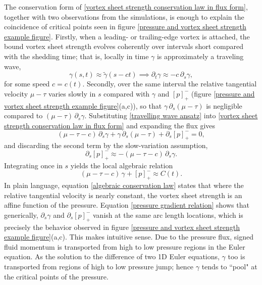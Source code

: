 \documentclass{article}[12pt]
\theoremstyle{Theorem}
\begin{document}
The conservation form of \eqref{vortex sheet strength conservation law in flux form}, together with two observations from the simulations, is enough to explain the coincidence of critical points seen in figure \ref{pressure and vortex sheet strength example figure}. Firstly, when a leading- or trailing-edge vortex is attached, the bound vortex sheet strength evolves coherently over intervals short compared with the shedding time; that is, locally in time $\gamma$ is approximately a traveling wave,
\begin{equation}
    \gamma(s,t) \approx \tilde{\gamma}(s - ct)
    \implies
    \partial_t\gamma \approx -c\,\partial_s\gamma,
    \label{travelling wave ansatz}
\end{equation}
for some speed $c = c(t)$. Secondly, over the same interval the relative tangential velocity $\mu - \tau$ varies slowly in $s$ compared with $\gamma$ and $[p]^-_+$ (figure \ref{pressure and vortex sheet strength example figure}(a,c)), so that $\gamma\,\partial_s(\mu - \tau)$ is negligible compared to $(\mu - \tau)\,\partial_s\gamma$. Substituting \eqref{travelling wave ansatz} into \eqref{vortex sheet strength conservation law in flux form} and expanding the flux gives
\begin{equation}
    (\mu - \tau - c)\,\partial_s\gamma
    + \gamma\,\partial_s(\mu - \tau)
    + \partial_s[p]^-_+ = 0,
    \label{expanded flux relation}
\end{equation}
and discarding the second term by the slow-variation assumption,
\begin{equation}
    \partial_s[p]^-_+ \approx -(\mu - \tau - c)\,\partial_s\gamma.
    \label{pressure gradient relation}
\end{equation}
Integrating once in $s$ yields the local algebraic relation
\begin{equation}
    (\mu - \tau - c)\,\gamma + [p]^-_+ \approx C(t).
    \label{algebraic conservation law}
\end{equation}
In plain language, equation \eqref{algebraic conservation law} states that where the relative tangential velocity is nearly constant, the vortex sheet strength is an affine function of the pressure. Equation \eqref{pressure gradient relation} shows that generically, $\partial_s\gamma$ and $\partial_s[p]^-_+$ vanish at the same arc length locations, which is precisely the behavior observed in figure \ref{pressure and vortex sheet strength example figure}(a,c). 
This makes intuitive sense. Due to the pressure flux, signed fluid momentum is transported from high to low pressure regions in the Euler equation. As the solution to the difference of two 1D Euler equations, $\gamma$ too is transported from regions of high to low pressure jump; hence $\gamma$ tends to ``pool" at the critical points of the pressure.
\newline
\end{document}
